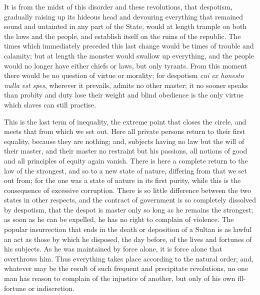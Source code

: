 \documentclass[12pt]{report}
\begin{document}
It is from the midst of this disorder and these revolutions, that despotism, gradually raising up its hideous head and devouring everything that remained sound and untainted in any part of the State, would at length trample on both the laws and the people, and establish itself on the ruins of the republic. The times which immediately preceded this last change would be times of trouble and calamity; but at length the monster would swallow up everything, and the people would no longer have either chiefs or laws, but only tyrants. From this moment there would be no question of virtue or morality; for despotism \textit{cui ex honesto nulla est spes}, wherever it prevails, admits no other master; it no sooner speaks than probity and duty lose their weight and blind obedience is the only virtue which slaves can still practise.

This is the last term of inequality, the extreme point that closes the circle, and meets that from which we set out. Here all private persons return to their first equality, because they are nothing; and, subjects having no law but the will of their master, and their master no restraint but his passions, all notions of good and all principles of equity again vanish. There is here a complete return to the law of the strongest, and so to a new state of nature, differing from that we set out from; for the one was a state of nature in its first purity, while this is the consequence of excessive corruption. There is so little difference between the two states in other respects, and the contract of government is so completely dissolved by despotism, that the despot is master only so long as he remains the strongest; as soon as he can be expelled, he has no right to complain of violence. The popular insurrection that ends in the death or deposition of a Sultan is as lawful an act as those by which he disposed, the day before, of the lives and fortunes of his subjects. As he was maintained by force alone, it is force alone that overthrows him. Thus everything takes place according to the natural order; and, whatever may be the result of such frequent and precipitate revolutions, no one man has reason to complain of the injustice of another, but only of his own ill-fortune or indiscretion.
\end{document}
